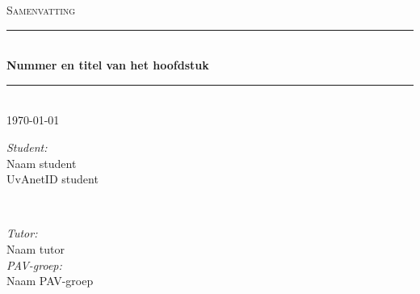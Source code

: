 \documentclass[a4paper,12pt]{article}
\newcommand{\opdracht}{Samenvatting}			%
\newcommand{\titel}{Nummer en titel van het hoofdstuk}	%
\newcommand{\studentA}{Naam student}			%
\newcommand{\uvanetidA}{UvAnetID student}
\newcommand{\tutor}{Naam tutor}				%
\newcommand{\PAVgroep}{Naam  PAV-groep}		%
\newcommand{\datum}{\today}					%
\begin{document}
\thispagestyle{firststyle}
\begin{center}
	\textsc{\Large \opdracht}\\[0.2cm]
		\rule{\linewidth}{0.5pt} \\[0.4cm]
			{ \huge \bfseries \titel}
		\rule{\linewidth}{0.5pt} \\[0.2cm]
	{\large \datum  \\[0.4cm]}

	\begin{minipage}{0.4\textwidth}
		\begin{flushleft}
			\emph{Student:}\\
			{\studentA \\ {\small \uvanetidA \\[0.2cm]}}
		\end{flushleft}
	\end{minipage}
~
	\begin{minipage}{0.4\textwidth}
		\begin{flushright}
			\emph{Tutor:} \\
			\tutor \\[0.2cm]
			\emph{PAV-groep:} \\
			\PAVgroep \\[0.2cm]
		\end{flushright}
	\end{minipage}\\[1 cm]
\end{center}


\lipsum[1]

\end{document}
